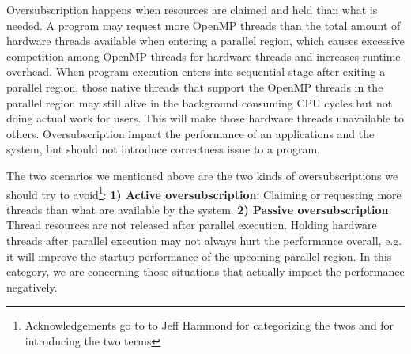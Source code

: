 Oversubscription happens when resources are claimed and held than what is needed.
A program may request more OpenMP threads than the total amount of hardware
threads available when entering a parallel region, which causes excessive competition 
among OpenMP threads for hardware threads and increases runtime overhead. 
When program execution enters into sequential stage after exiting a parallel region, 
those native threads that support the OpenMP threads in the parallel region may still 
alive in the background consuming CPU cycles but not doing actual work for users. This 
will make those hardware threads unavailable to others. 
Oversubscription impact the performance of an applications and the system, 
but should not introduce correctness issue to a program. 


The two scenarios we mentioned above are the two kinds of oversubscriptions we should try to avoid\footnote{Acknowledgements go to to Jeff Hammond for categorizing the twos and for introducing the two terms}:  
{\bf 1) Active oversubscription}: Claiming or requesting more threads than 
what are available by the system.
{\bf 2) Passive oversubscription}: Thread resources are not released 
after parallel execution. Holding hardware threads after parallel execution may not 
always hurt the performance overall, e.g. it will improve the startup performance of the 
upcoming parallel region. In this category, we are concerning those situations that 
actually impact the performance negatively.


